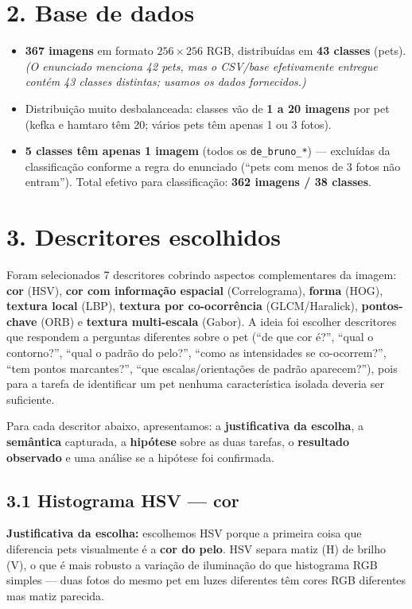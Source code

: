 \documentclass[12pt, a4paper]{article}
\begin{document}
\newpage
\section*{2. Base de dados}
\begin{itemize}
    \item \textbf{367 imagens} em formato $256\times256$ RGB, distribuídas em \textbf{43 classes} (pets). \textit{(O enunciado menciona 42 pets, mas o CSV/base efetivamente entregue contém 43 classes distintas; usamos os dados fornecidos.)}
    \item Distribuição muito desbalanceada: classes vão de \textbf{1 a 20 imagens} por pet (kefka e hamtaro têm 20; vários pets têm apenas 1 ou 3 fotos).
    \item \textbf{5 classes têm apenas 1 imagem} (todos os \texttt{de\_bruno\_*}) --- excluídas da classificação conforme a regra do enunciado (``pets com menos de 3 fotos não entram''). Total efetivo para classificação: \textbf{362 imagens / 38 classes}.
\end{itemize}

\section*{3. Descritores escolhidos}
Foram selecionados 7 descritores cobrindo aspectos complementares da imagem: \textbf{cor} (HSV), \textbf{cor com informação espacial} (Correlograma), \textbf{forma} (HOG), \textbf{textura local} (LBP), \textbf{textura por co-ocorrência} (GLCM/Haralick), \textbf{pontos-chave} (ORB) e \textbf{textura multi-escala} (Gabor). A ideia foi escolher descritores que respondem a perguntas diferentes sobre o pet (``de que cor é?'', ``qual o contorno?'', ``qual o padrão do pelo?'', ``como as intensidades se co-ocorrem?'', ``tem pontos marcantes?'', ``que escalas/orientações de padrão aparecem?''), pois para a tarefa de identificar um pet nenhuma característica isolada deveria ser suficiente.

Para cada descritor abaixo, apresentamos: a \textbf{justificativa da escolha}, a \textbf{semântica} capturada, a \textbf{hipótese} sobre as duas tarefas, o \textbf{resultado observado} e uma análise se a hipótese foi confirmada.

\subsection*{3.1 Histograma HSV --- cor}

\textbf{Justificativa da escolha:} escolhemos HSV porque a primeira coisa que diferencia pets visualmente é a \textbf{cor do pelo}. HSV separa matiz (H) de brilho (V), o que é mais robusto a variação de iluminação do que histograma RGB simples --- duas fotos do mesmo pet em luzes diferentes têm cores RGB diferentes mas matiz parecida.
\end{document}

